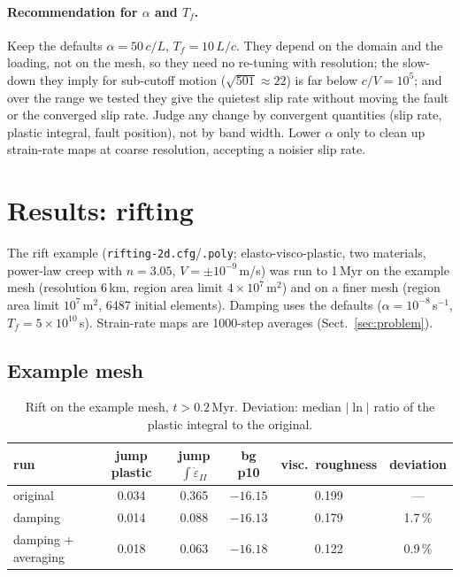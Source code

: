 \documentclass[11pt]{article}
\newcommand{\edot}{\dot\varepsilon_{II}}
\newcommand{\code}[1]{\texttt{#1}}
\begin{document}
\paragraph{Recommendation for $\alpha$ and $T_f$.} Keep the defaults $\alpha=50\,c/L$,
$T_f=10\,L/c$. They depend on the domain and the loading, not on the mesh, so they need no
re-tuning with resolution; the slow-down they imply for sub-cutoff motion ($\sqrt{501}\approx22$) is far below
$c/V=10^5$; and over the range we tested they give the quietest slip rate without moving
the fault or the converged slip rate. Judge any change by convergent quantities (slip rate, plastic
integral, fault position), not by band width. Lower $\alpha$ only to clean up strain-rate
maps at coarse resolution, accepting a noisier slip rate.

\section{Results: rifting}
\label{sec:rift}

The rift example (\code{rifting-2d.cfg}/\code{.poly}; elasto-visco-plastic, two materials, power-law
creep with $n=3.05$, $V=\pm10^{-9}$\,m/s) was run to 1\,Myr on the example mesh (resolution 6\,km,
region area limit $4\times10^7$\,m$^2$) and on a finer mesh (region area limit $10^7$\,m$^2$,
6487 initial elements). Damping uses the defaults ($\alpha=10^{-8}$\,s$^{-1}$, $T_f=5\times10^{10}$\,s).
Strain-rate maps are 1000-step averages (Sect.~\ref{sec:problem}).

\subsection{Example mesh}
\begin{table}[h]
  \centering\small
  \caption{Rift on the example mesh, $t>0.2$\,Myr. Deviation: median $|\ln|$ ratio of the plastic
  integral to the original.}
  \label{tab:riftlo}
  \begin{tabular}{lccccc}
  \toprule
  run & jump plastic & jump $\int\edot$ & bg p10 & visc.\ roughness & deviation\\
  \midrule
  original            & 0.034 & 0.365 & $-16.15$ & 0.199 & ---\\
  damping             & 0.014 & 0.088 & $-16.13$ & 0.179 & 1.7\,\%\\
  damping + averaging & 0.018 & 0.063 & $-16.18$ & 0.122 & 0.9\,\%\\
  \bottomrule
  \end{tabular}
\end{table}
\end{document}
